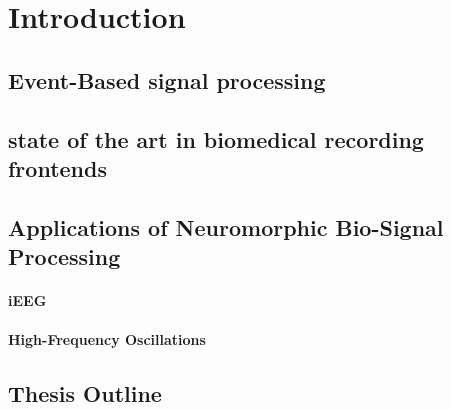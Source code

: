 \chapter{Introduction}
\label{chapter:introduction}
\section{Event-Based signal processing}
\section{state of the art in biomedical recording frontends}
\section{Applications of Neuromorphic Bio-Signal Processing} 
\subsubsection{iEEG}
\subsubsection{High-Frequency Oscillations}
\section{Thesis Outline} %